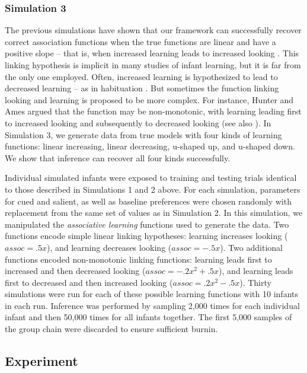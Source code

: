 \documentclass[12pt]{article}
\begin{document}
\subsubsection*{Simulation 3}

	The previous simulations have shown that our framework can successfully recover correct association functions when the true functions are linear and have a positive slope – that is, when increased learning leads to increased looking \cite{Yu2011a}. This linking hypothesis is implicit in many studies of infant learning, but it is far from the only one employed. Often, increased learning is hypothesized to lead to decreased learning – as in habituation \cite{Fantz1964, Stager1997, Gilmore2002}. But sometimes the function linking looking and learning is proposed to be more complex. For instance, Hunter and Ames \cite{Hunter1988} argued that the function may be non-monotonic, with learning leading first to increased looking and subsequently to decreased looking (see also \cite{Cohen2004, Houston-Price2004}). In Simulation 3, we generate data from true models with four kinds of learning functions: linear increasing, linear decreasing, u-shaped up, and u-shaped down. We show that inference can recover all four kinds successfully. 

	Individual simulated infants were exposed to training and testing trials identical to those described in Simulations 1 and 2 above. For each simulation, parameters for cued and salient, as well as baseline preferences were chosen randomly with replacement from the same set of values as in Simulation 2. In this simulation, we manipulated the \emph{associative learning} functions used to generate the data. Two functions encode simple linear linking hypotheses: learning increases looking ($assoc = .5x$), and learning decreases looking ($assoc = -.5x$). Two additional functions encoded non-monotonic linking functions: learning leads first to increased and then decreased looking ($assoc = -.2x^{2} + .5x$), and learning leads first to decreased and then increased looking ($assoc = .2x^{2} - .5x$). Thirty simulations were run for each of these possible learning functions with 10 infants in each run. Inference was performed by sampling 2,000 times for each individual infant and then 50,000 times for all infants together. The first 5,000 samples of the group chain were discarded to ensure sufficient burnin.

\subsection*{Experiment}
\end{document}
